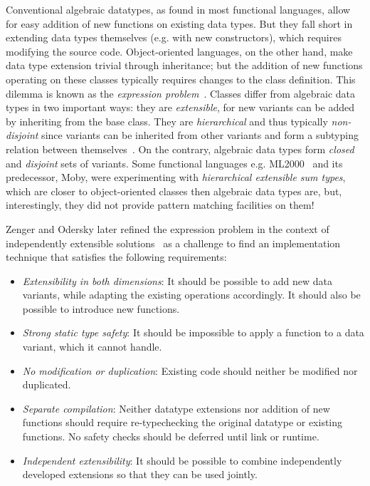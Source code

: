 Conventional algebraic datatypes, as found in most functional languages, allow 
for easy addition of new functions on existing data types. But they fall short 
in extending data types themselves (e.g. with new constructors), which requires 
modifying the source code. Object-oriented languages, on the other hand, make 
data type extension trivial through inheritance; but the addition of new 
functions operating on these classes typically requires changes to the class 
definition. This dilemma is known as the \emph{expression problem}~\cite{Cook90,exprproblem}.  
Classes differ from algebraic data  types in two important ways: they
are \emph{extensible}, for new variants can be added by inheriting from
the base class.  They are \emph{hierarchical} and thus typically
\emph{non-disjoint} since variants can be inherited from other variants
and form a subtyping relation between themselves~\cite{Glew99}. 
On the contrary, algebraic data types form \emph{closed} and \emph{disjoint}
sets of variants. Some functional languages e.g. ML2000~\cite{ML2000}
and its predecessor, Moby, were experimenting with 
\emph{hierarchical extensible sum types}, which are closer to 
object-oriented classes then algebraic data types are, but, 
interestingly, they did not provide pattern matching facilities on them!

Zenger and Odersky later refined the expression problem in the context of 
independently extensible solutions~\cite{fool12} as a challenge to find an 
implementation technique that satisfies the following requirements:

\begin{itemize}
\setlength{\itemsep}{0pt}
\setlength{\parskip}{0pt}
\item \emph{Extensibility in both dimensions}: It should be possible to add new 
      data variants, while adapting the existing operations accordingly. It 
      should also be possible to introduce new functions. 
\item \emph{Strong static type safety}: It should be impossible to apply a 
      function to a data variant, which it cannot handle. 
\item \emph{No modification or duplication}: Existing code should neither be 
      modified nor duplicated.
\item \emph{Separate compilation}: Neither datatype extensions nor addition of 
      new functions should require re-typechecking the original datatype or 
      existing functions. No safety checks should be deferred until link or 
      runtime.
\item \emph{Independent extensibility}: It should be possible to combine 
      independently developed extensions so that they can be used jointly.
\end{itemize}

